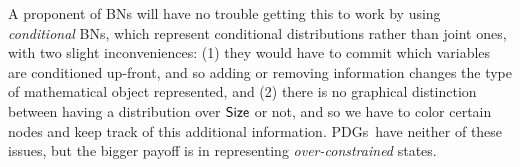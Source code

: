 \documentclass{article}
\newcommand{\MN}{PDG}
\newcommand{\MNs}{\MN s}
\numberwithin{equation}{section}
\begin{document}
\begin{notfocus}
\begin{example}
		\begin{vfull}
			A proponent of BNs will have no trouble getting this to work by using \emph{conditional} BNs, which represent conditional distributions rather than joint ones, with two slight inconveniences: (1) they would have to commit which variables are conditioned up-front, and so adding or removing information changes the type of mathematical object represented, and (2) there is no graphical distinction between having a distribution over $\sf Size$ or not, and so we have to color certain nodes and keep track of this additional information. \MNs\ have neither of these issues, but the bigger payoff is in representing \textit{over-constrained} states.
		\end{vfull}
	
	

\end{example}
\end{notfocus}
\end{document}
